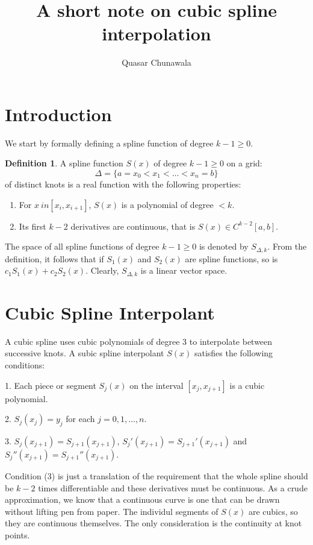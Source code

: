 \documentclass{article}
\title{A short note on cubic spline interpolation}
\author{Quasar Chunawala}
\theoremstyle{definition}
\newtheorem{definition}{Definition}[section]
\begin{document}
\maketitle

\section{Introduction}

We start by formally defining a spline function of degree $k - 1 \geq 0$. 

\begin{definition}
    A spline function $S(x)$ of degree $k - 1 \geq 0$ on a grid: 
    $$
    \Delta = \{a = x_0 < x_1 < \ldots < x_n = b\}
    $$
    of distinct knots is a real function with the following properties:
    \begin{enumerate}
        \item For $x \ in [x_i, x_{i+1}]$, $S(x)$  is a polynomial of degree $< k$.
        \item Its first $k - 2$ derivatives are continuous, that is $S(x) \in C^{k-2}[a,b]$.
    \end{enumerate}
\end{definition}

The space of all spline functions of degree $k - 1 \geq 0$ is denoted by $S_{\Delta,k}$. From the definition, it follows that if $S_1(x)$ and $S_2(x)$ are spline functions, so is $c_1 S_1(x) + c_2 S_2(x)$. Clearly, $S_{\Delta, k}$ is a linear vector space. 

\section{Cubic Spline Interpolant}

A cubic spline uses cubic polynomials of degree $3$ to interpolate between successive knots. A subic spline interpolant $S(x)$ satisfies the following conditions:

1. Each piece or segment $S_j(x)$ on the interval $[x_j, x_{j+1}]$ is a cubic polynomial.

2. $S_j(x_j) = y_j$ for each $j = 0, 1, \ldots, n$.

3. $S_j(x_{j+1}) = S_{j+1}(x_{j + 1})$, $S_j'(x_{j+1}) = S_{j+1}'(x_{j+1})$ and $S_j''(x_{j+1}) = S_{j+1}''(x_{j+1})$.

Condition (3) is just a translation of the requirement that the whole spline should be $k-2$ times differentiable and these derivatives must be continuous. As a crude approximation, we know that a continuous curve is one that can be drawn without lifting pen from paper. The individul segments of $S(x)$ are cubics, so they are continuous themselves. The only consideration is the continuity at knot points.
\end{document}
